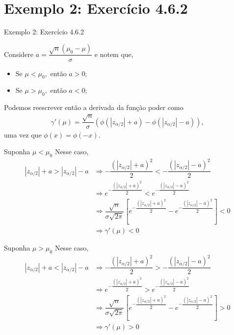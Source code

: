 \documentclass[12pt]{beamer}
\begin{document}
\section{Exemplo 2: Exercício 4.6.2}
\begin{frame}{Exemplo 2: Exercício 4.6.2}
\begin{block}{}
\justifying
Considere $a=\dfrac{\sqrt{n}(\mu_0 - \mu)}{\sigma}$ e notem que,
\begin{itemize}
    \item Se $\mu<\mu_{0},$ então $a>0;$
    \pause
    \item Se $\mu>\mu_{0},$ então $a<0;$
\end{itemize}
\end{block}
\pause 
\begin{block}{}
\justifying
Podemos reescrever então a derivada da função poder como
\begin{align*}
\gamma'(\mu) = \dfrac{\sqrt{n}}{\sigma} \left(\phi\left( |z_{\alpha/2}|+a\right) - \phi\left(|z_{\alpha/2}|-a\right)\right),
\end{align*}
uma vez que $\phi(x)=\phi(-x).$ 
\end{block}
\end{frame}

\begin{frame}{}
\begin{block}{Suponha $\mu<\mu_{0}$}
\justifying
Nesse caso, 
\begin{align*}
    |z_{\alpha/2}|+a>|z_{\alpha/2}|-a&\Rightarrow -\dfrac{(|z_{\alpha/2}|+a)^{2}}{2}<-\dfrac{(|z_{\alpha/2}|-a)^{2}}{2}\\
    &\Rightarrow e^{-\dfrac{(|z_{\alpha/2}|+a)^{2}}{2}} < e^{-\dfrac{(|z_{\alpha/2}|-a)^{2}}{2}}\\
    &\Rightarrow \dfrac{\sqrt{n}}{\sigma\sqrt{2\pi}}\left[e^{-\dfrac{(|z_{\alpha/2}|+a)^{2}}{2}}-e^{-\dfrac{(|z_{\alpha/2}|-a)^{2}}{2}}\right]<0\\
    &\Rightarrow \gamma'(\mu)<0
\end{align*}
\end{block}
\end{frame}


\begin{frame}{}
\begin{block}{Suponha $\mu>\mu_{0}$}
\justifying
Nesse caso, 
\begin{align*}
    |z_{\alpha/2}|+a<|z_{\alpha/2}|-a&\Rightarrow -\dfrac{(|z_{\alpha/2}|+a)^{2}}{2}>-\dfrac{(|z_{\alpha/2}|-a)^{2}}{2}\\
    &\Rightarrow e^{-\dfrac{(|z_{\alpha/2}|+a)^{2}}{2}} > e^{-\dfrac{(|z_{\alpha/2}|-a)^{2}}{2}}\\
    &\Rightarrow \dfrac{\sqrt{n}}{\sigma\sqrt{2\pi}}\left[e^{-\dfrac{(|z_{\alpha/2}|+a)^{2}}{2}}-e^{-\dfrac{(|z_{\alpha/2}|-a)^{2}}{2}}\right]>0\\
    &\Rightarrow \gamma'(\mu)>0
\end{align*}
\end{block}
\end{frame}
\end{document}

